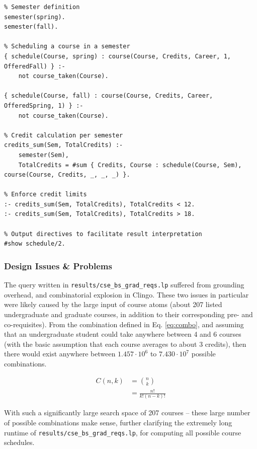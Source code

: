 \documentclass[12pt]{article}
\begin{document}
    \begin{lstlisting}
% Semester definition
semester(spring).
semester(fall).

% Scheduling a course in a semester
{ schedule(Course, spring) : course(Course, Credits, Career, 1, OfferedFall) } :-
    not course_taken(Course).

{ schedule(Course, fall) : course(Course, Credits, Career, OfferedSpring, 1) } :-
    not course_taken(Course).

% Credit calculation per semester
credits_sum(Sem, TotalCredits) :-
    semester(Sem),
    TotalCredits = #sum { Credits, Course : schedule(Course, Sem), course(Course, Credits, _, _, _) }.

% Enforce credit limits
:- credits_sum(Sem, TotalCredits), TotalCredits < 12.
:- credits_sum(Sem, TotalCredits), TotalCredits > 18.

% Output directives to facilitate result interpretation
#show schedule/2.
    \end{lstlisting}


    \subsubsection{Design Issues \& Problems}
    \label{subsubsec:des-iss-probs}

    The query written in {\tt{results/cse\_bs\_grad\_reqs.lp}} suffered from grounding overhead, and combinatorial explosion in Clingo. These two issues in particular were likely caused by the large input of course atoms (about 207 listed undergraduate and graduate courses, in addition to their corresponding pre- and co-requisites). From the combination defined in Eq. \ref{eq:combo}, and assuming that an undergraduate student could take anywhere between 4 and 6 courses (with the basic assumption that each course averages to about 3 credits), then there would exist anywhere between $1.457 \cdot 10^6$ to $7.430 \cdot 10^7$ possible combinations.

    \begin{equation}
        \begin{aligned}
            C(n, k) & = \binom{n}{k} \\
            & =\frac{n!}{k!(n-k)!}
        \end{aligned}
        \label{eq:combo}
    \end{equation}

    With such a significantly large search space of 207 courses -- these large number of possible combinations make sense, further clarifying the extremely long runtime of {\tt{results/cse\_bs\_grad\_reqs.lp}}, for computing all possible course schedules.
\end{document}
